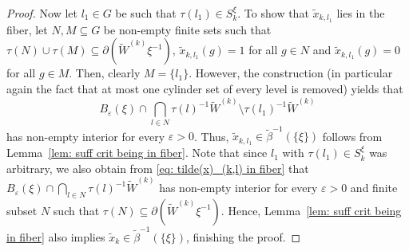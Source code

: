 \documentclass[titlepage,reqno,10pt]{amsart}
\theoremstyle{definition}
\newcommand{\tm}{\subseteq}
\begin{document}
\begin{proof}
Now let $l_1\in G$ be such that $\tau(l_1)\in S_k^\xi$.
To show that $\widetilde{x}_{k,l_1}$ lies in the fiber, let $N,M\tm G$ be non-empty finite sets such that $\tau(N)\cup \tau(M)\tm \partial(\widetilde{W}^{(k)}\xi^{-1})$, $\widetilde{x}_{k,l_1}(g)=1$ for all $g\in N$ and $\widetilde{x}_{k,l_1}(g) = 0$ for all $g\in M$.
Then, clearly $M=\{l_1\}$.
However, the construction (in particular again  the fact that at most one cylinder set of every level is removed) yields that 
\begin{equation}\label{eq: tilde(x)_(k,l) in fiber}
 B_\varepsilon(\xi) \cap \bigcap_{l\in N} \tau(l)^{-1}\widetilde{W}^{(k)}\setminus  \tau(l_1)^{-1}\widetilde{W}^{(k)}
\end{equation}
has non-empty interior for every $\varepsilon>0$. 
Thus, $\widetilde{x}_{k,l_1}\in \widetilde{\beta}^{-1}(\{\xi\})$ follows from Lemma~\ref{lem: suff crit being in fiber}.
Note that since $l_1$ with $\tau(l_1)\in S_k^\xi$ was arbitrary, we also obtain from \eqref{eq: tilde(x)_(k,l) in fiber} that $B_{\varepsilon}(\xi) \cap \bigcap_{l \in N} \tau(l)^{-1} \widetilde{W}^{(k)}$ has non-empty interior for every $\varepsilon>0$ and finite subset $N$ such that $\tau(N)\tm \partial(\widetilde{W}^{(k)}\xi^{-1})$.
Hence, Lemma~\ref{lem: suff crit being in fiber} also implies $\widetilde{x}_k\in \widetilde{\beta}^{-1}(\{\xi\})$, finishing the proof.
\end{proof}
\end{document}
